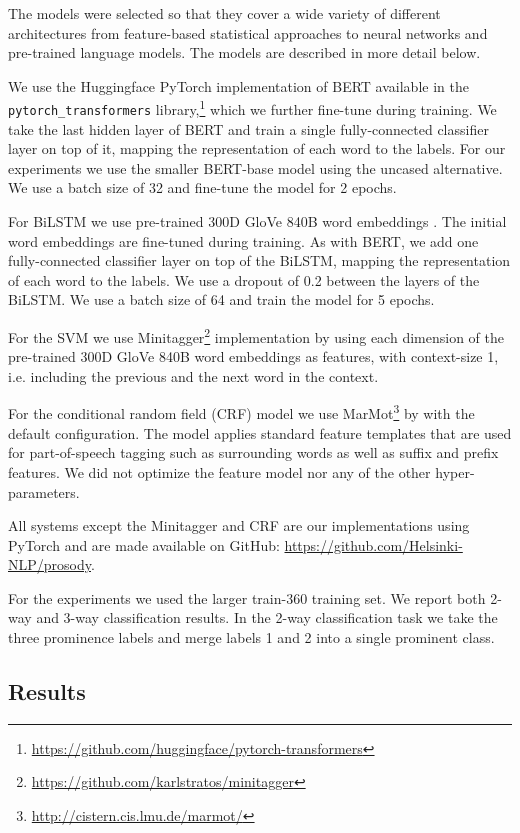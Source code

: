 \documentclass[11pt]{article}
\begin{document}
The models were selected so that they cover a wide variety of different architectures from feature-based statistical approaches to neural networks and pre-trained language models. The models are described in more detail below.

We use the Huggingface PyTorch implementation of BERT available in the \texttt{pytorch\_transformers} library,\footnote{\url{https://github.com/huggingface/pytorch-transformers}} which we further fine-tune during training. We take the last hidden layer of BERT and train a single fully-connected classifier layer on top of it, mapping the representation of each word to the labels.
For our experiments we use the smaller BERT-base model using the uncased alternative. We use a batch size of 32 and fine-tune the model for 2 epochs.

For BiLSTM we use pre-trained 300D GloVe 840B word embeddings \cite{pennington2014glove}. The initial word embeddings are fine-tuned during training. As with BERT, we add one fully-connected classifier layer on top of the BiLSTM, mapping the representation of each word to the labels. 
We use a dropout of 0.2 between the layers of the BiLSTM. We use a batch size of 64 and train the model for 5 epochs.

For the SVM we use Minitagger\footnote{\url{https://github.com/karlstratos/minitagger}} implementation by \citet{stratos-collins-2015-simple} using each dimension of the pre-trained 300D GloVe 840B word embeddings as features, with context-size 1, i.e. including the previous and the next word in the context.

For the conditional random field (CRF) model we use MarMot\footnote{\url{http://cistern.cis.lmu.de/marmot/}} by \citet{mueller-etal-2013-efficient} with the default configuration. The model applies standard feature templates that are used for part-of-speech tagging such as surrounding words as well as suffix and prefix features. We did not optimize the feature model nor any of the other hyper-parameters.

All systems except the Minitagger and CRF are our implementations using PyTorch and are made available on GitHub: \url{https://github.com/Helsinki-NLP/prosody}.

For the experiments we used the larger train-360 training set. We report both 2-way and 3-way classification results. In the 2-way classification task we take the three prominence labels and merge labels 1 and 2 into a single prominent class.

\subsection{Results}
\end{document}
